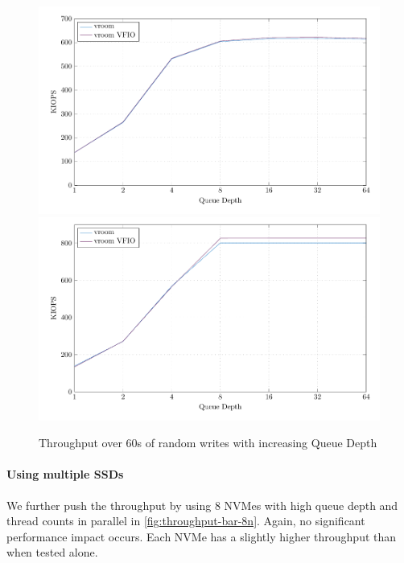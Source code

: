 \begin{figure}[H]
  \centering
   {\includegraphics[width=.8\textwidth]{figures/qdnt1_2MiB} \label{fig:qdnt1-2MiB-intel}}
   {\includegraphics[width=.8\textwidth]{figures/qdnt1_2MiB_epyc} \label{fig:qdnt1-2MiB-epyc}}
  \caption{Throughput over 60s of random writes with increasing Queue Depth}
  \label{fig:qdnt1-2MiB}
\end{figure}

\paragraph{Using multiple SSDs} We further push the throughput by using 8 NVMes with high queue depth and thread counts in parallel in \autoref{fig:throughput-bar-8n}. Again, no significant performance impact occurs. Each NVMe has a slightly higher throughput than when tested alone.


